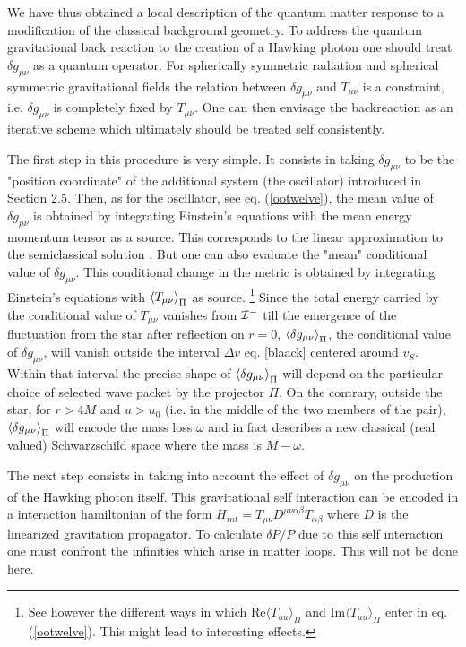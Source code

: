 We have thus obtained a local description of the quantum matter response to a
modification of the classical background geometry. To address the quantum
gravitational back reaction to the creation of a Hawking photon one should
treat
$\delta g_{\mu\nu}$ as a quantum operator\cite{THooft}\cite{bmpps}.
For spherically symmetric radiation and
spherical symmetric gravitational fields the relation between $\delta
g_{\mu\nu}$ and $T_{\mu\nu}$ is a constraint, i.e.
$\delta g_{\mu\nu}$ is completely fixed by $T_{\mu\nu}$. One can then envisage
the backreaction as an iterative scheme which ultimately should be treated self
consistently.

The first step in this procedure is very simple. It consists in
taking $\delta g_{\mu\nu}$ to
be the "position coordinate" of the additional system (the
oscillator) introduced in Section 2.5.
Then, as for the oscillator, see eq. (\ref{ootwelve}),
the mean value of $\delta g_{\mu\nu}$ is obtained by integrating
Einstein's equations
with the mean energy momentum tensor as a source.
This corresponds to the linear approximation to the semiclassical solution
\cite{Massar2}.
But one can also evaluate the "mean" conditional
value of $\delta g_{\mu\nu}$. This conditional
change in the metric
 is obtained by integrating Einstein's equations
with $\mbox{$ \langle T_{\mu\nu} \rangle $}_{\Pi}$ as source.
\footnote{See however the different ways in which Re$\langle T_{uu}\rangle_\Pi$
and Im$\langle T_{uu}\rangle_\Pi$ enter in eq. (\ref{ootwelve}). This might
lead to interesting effects.}
 Since the total energy carried by the conditional
value of $T_{\mu\nu}$
vanishes from ${\cal I}^-$ till the emergence of the fluctuation from the star
after reflection on $r=0$, $\mbox{$ \langle \delta g_{\mu\nu} \rangle $}_{\Pi}$, the conditional
value of $\delta g_{\mu\nu}$, will vanish
outside the interval $\Delta v$ eq. \ref{blaack} centered around $v_S$.
Within that interval the precise
shape of  $\mbox{$ \langle \delta g_{\mu\nu} \rangle $}_{\Pi}$
 will depend on the particular choice of
selected wave packet by the projector ${\Pi}$.
On the contrary, outside the star, for $r>4M$ and
$u> u_0$ (i.e. in the middle
of the two members of the pair), $\mbox{$ \langle \delta g_{\mu\nu} \rangle $}_{\Pi}$ will encode the
mass loss
$\omega$ and in fact describes a new classical (real valued)
Schwarzschild space where the mass is
$M-\omega$.

The next step consists in taking
 into account the effect of $\delta g_{\mu\nu}$
on the production of the Hawking photon itself. This gravitational self
interaction can be encoded in
 a interaction
hamiltonian of the form $H_{int} = T_{\mu \nu} D^{\mu \nu
\alpha\beta}T_{\alpha\beta}$ where $D$ is the linearized gravitation
propagator.
To calculate $\delta P/P$ due to this self interaction one must confront the
infinities which arise in matter loops. This will not be done here.

